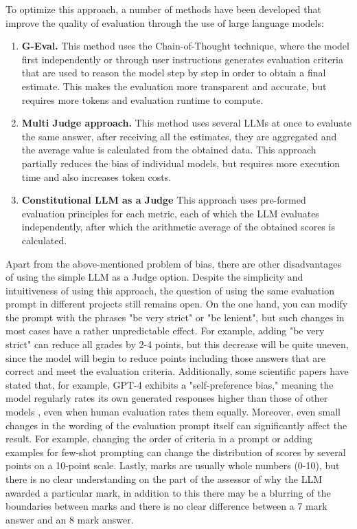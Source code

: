 \documentclass[sn-basic]{sn-jnl}
\theoremstyle{thmstyleone}%
\theoremstyle{thmstyletwo}%
\theoremstyle{thmstylethree}%
\begin{document}
To optimize this approach, a number of methods have been developed that improve the quality of evaluation through the use of large language models: 
\begin{enumerate} 
\item \textbf{G-Eval.} This method \cite{Liu2023} uses the Chain-of-Thought technique, where the model first independently or through user instructions generates evaluation criteria that are used to reason the model step by step in order to obtain a final estimate. This makes the evaluation more transparent and accurate, but requires more tokens and evaluation runtime to compute. 
\item \textbf{Multi Judge approach.} This method uses several LLMs at once to evaluate the same answer, after receiving all the estimates, they are aggregated and the average value is calculated from the obtained data. This approach partially reduces the bias of individual models, but requires more execution time and also increases token costs. 
\item \textbf{Constitutional LLM as a Judge} This approach uses pre-formed evaluation principles for each metric, each of which the LLM evaluates independently, after which the arithmetic average of the obtained scores is calculated. 
\end{enumerate}

Apart from the above-mentioned problem of bias, there are other disadvantages of using the simple LLM as a Judge option. Despite the simplicity and intuitiveness of using this approach, the question of using the same evaluation prompt in different projects still remains open. On the one hand, you can modify the prompt with the phrases "be very strict" or "be lenient", but such changes in most cases have a rather unpredictable effect. For example, adding "be very strict" can reduce all grades by 2-4 points, but this decrease will be quite uneven, since the model will begin to reduce points including those answers that are correct and meet the evaluation criteria. Additionally, some scientific papers have stated that, for example, GPT-4 exhibits a "self-preference bias," meaning the model regularly rates its own generated responses higher than those of other models \cite{Wang2024}, even when human evaluation rates them equally. Moreover, even small changes in the wording of the evaluation prompt itself can significantly affect the result. For example, changing the order of criteria in a prompt or adding examples for few-shot prompting can change the distribution of scores by several points on a 10-point scale. Lastly, marks are usually whole numbers (0-10), but there is no clear understanding on the part of the assessor of why the LLM awarded a particular mark, in addition to this there may be a blurring of the boundaries between marks and there is no clear difference between a 7 mark answer and an 8 mark answer.
\end{document}
